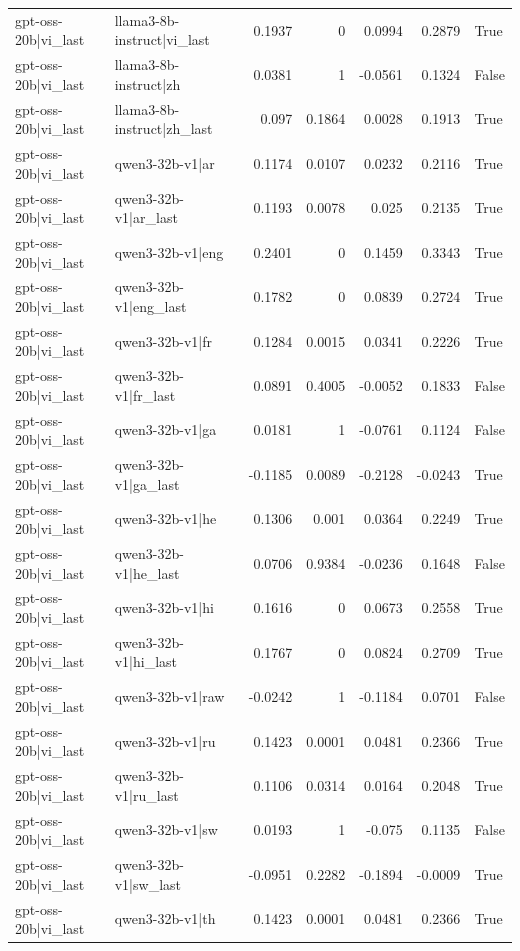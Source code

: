 \begin{table}
\begin{tabular}{l l r r r r l}
gpt-oss-20b|vi_last & llama3-8b-instruct|vi_last & 0.1937 & 0 & 0.0994 & 0.2879 & True \\
gpt-oss-20b|vi_last & llama3-8b-instruct|zh & 0.0381 & 1 & -0.0561 & 0.1324 & False \\
gpt-oss-20b|vi_last & llama3-8b-instruct|zh_last & 0.097 & 0.1864 & 0.0028 & 0.1913 & True \\
gpt-oss-20b|vi_last & qwen3-32b-v1|ar & 0.1174 & 0.0107 & 0.0232 & 0.2116 & True \\
gpt-oss-20b|vi_last & qwen3-32b-v1|ar_last & 0.1193 & 0.0078 & 0.025 & 0.2135 & True \\
gpt-oss-20b|vi_last & qwen3-32b-v1|eng & 0.2401 & 0 & 0.1459 & 0.3343 & True \\
gpt-oss-20b|vi_last & qwen3-32b-v1|eng_last & 0.1782 & 0 & 0.0839 & 0.2724 & True \\
gpt-oss-20b|vi_last & qwen3-32b-v1|fr & 0.1284 & 0.0015 & 0.0341 & 0.2226 & True \\
gpt-oss-20b|vi_last & qwen3-32b-v1|fr_last & 0.0891 & 0.4005 & -0.0052 & 0.1833 & False \\
gpt-oss-20b|vi_last & qwen3-32b-v1|ga & 0.0181 & 1 & -0.0761 & 0.1124 & False \\
gpt-oss-20b|vi_last & qwen3-32b-v1|ga_last & -0.1185 & 0.0089 & -0.2128 & -0.0243 & True \\
gpt-oss-20b|vi_last & qwen3-32b-v1|he & 0.1306 & 0.001 & 0.0364 & 0.2249 & True \\
gpt-oss-20b|vi_last & qwen3-32b-v1|he_last & 0.0706 & 0.9384 & -0.0236 & 0.1648 & False \\
gpt-oss-20b|vi_last & qwen3-32b-v1|hi & 0.1616 & 0 & 0.0673 & 0.2558 & True \\
gpt-oss-20b|vi_last & qwen3-32b-v1|hi_last & 0.1767 & 0 & 0.0824 & 0.2709 & True \\
gpt-oss-20b|vi_last & qwen3-32b-v1|raw & -0.0242 & 1 & -0.1184 & 0.0701 & False \\
gpt-oss-20b|vi_last & qwen3-32b-v1|ru & 0.1423 & 0.0001 & 0.0481 & 0.2366 & True \\
gpt-oss-20b|vi_last & qwen3-32b-v1|ru_last & 0.1106 & 0.0314 & 0.0164 & 0.2048 & True \\
gpt-oss-20b|vi_last & qwen3-32b-v1|sw & 0.0193 & 1 & -0.075 & 0.1135 & False \\
gpt-oss-20b|vi_last & qwen3-32b-v1|sw_last & -0.0951 & 0.2282 & -0.1894 & -0.0009 & True \\
gpt-oss-20b|vi_last & qwen3-32b-v1|th & 0.1423 & 0.0001 & 0.0481 & 0.2366 & True \\

\end{tabular}
\end{table}
